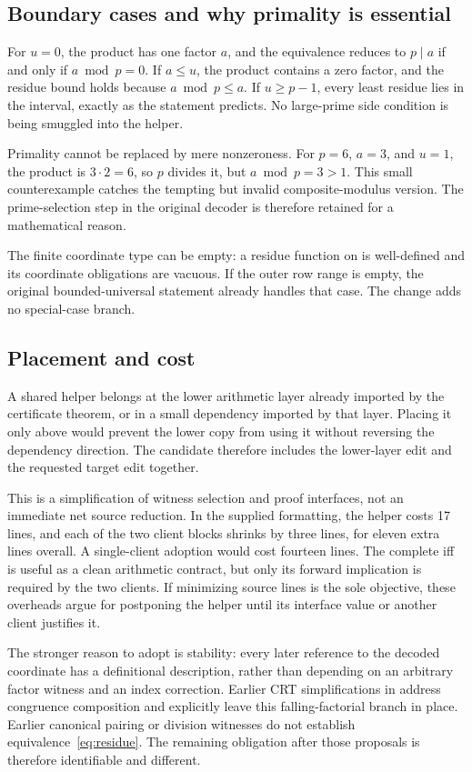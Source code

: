 \subsection{Boundary cases and why primality is essential}
For $u=0$, the product has one factor $a$, and the equivalence reduces to $p\mid a$ if and only if $a\bmod p=0$. If $a\le u$, the product contains a zero factor, and the residue bound holds because $a\bmod p\le a$. If $u\ge p-1$, every least residue lies in the interval, exactly as the statement predicts. No large-prime side condition is being smuggled into the helper.

Primality cannot be replaced by mere nonzeroness. For $p=6$, $a=3$, and $u=1$, the product is $3\cdot2=6$, so $p$ divides it, but $a\bmod p=3>1$. This small counterexample catches the tempting but invalid composite-modulus version. The prime-selection step in the original decoder is therefore retained for a mathematical reason.

The finite coordinate type can be empty: a residue function on  is well-defined and its coordinate obligations are vacuous. If the outer row range is empty, the original bounded-universal statement already handles that case. The change adds no special-case branch.

\subsection{Placement and cost}
A shared helper belongs at the lower arithmetic layer already imported by the certificate theorem, or in a small dependency imported by that layer. Placing it only above  would prevent the lower  copy from using it without reversing the dependency direction. The candidate therefore includes the lower-layer edit and the requested target edit together.

This is a simplification of witness selection and proof interfaces, not an immediate net source reduction. In the supplied formatting, the helper costs 17 lines, and each of the two client blocks shrinks by three lines, for eleven extra lines overall. A single-client adoption would cost fourteen lines. The complete iff is useful as a clean arithmetic contract, but only its forward implication is required by the two clients. If minimizing source lines is the sole objective, these overheads argue for postponing the helper until its interface value or another client justifies it.

The stronger reason to adopt is stability: every later reference to the decoded coordinate has a definitional description, rather than depending on an arbitrary factor witness and an index correction. Earlier CRT simplifications in  address congruence composition and explicitly leave this falling-factorial branch in place. Earlier canonical pairing or division witnesses do not establish equivalence~\eqref{eq:residue}. The remaining obligation after those proposals is therefore identifiable and different.
